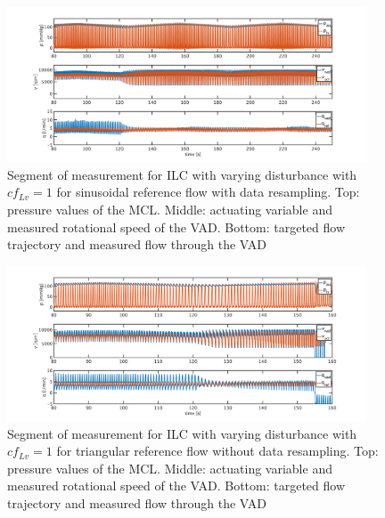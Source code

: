 \begin{figure}[ht!]
  \centering
  \includegraphics[width=0.95\textwidth]{images/chapt_5/ILC/ilc_var_dist_fix_sine.pdf}
  \caption[Segment of measurement for ILC with varying disturbance with $cf_{Lv}=1$ for sinusoidal reference flow with data resampling]{Segment of measurement for ILC with varying disturbance with $cf_{Lv}=1$ for sinusoidal reference flow with data resampling. Top:  pressure values of the MCL. Middle: actuating variable and measured rotational speed of the VAD. Bottom: targeted flow trajectory and measured flow through the VAD}
   \label{fig:anh_10}
\end{figure}

\begin{figure}[ht!]
  \centering
  \includegraphics[width=0.95\textwidth]{images/chapt_5/ILC/ilc_var_dist_unfix_triang.pdf}
  \caption[Segment of measurement for ILC with varying disturbance with $cf_{Lv}=1$ for triangular reference flow without data resampling]{Segment of measurement for ILC with varying disturbance with $cf_{Lv}=1$ for triangular reference flow without data resampling. Top:  pressure values of the MCL. Middle: actuating variable and measured rotational speed of the VAD. Bottom: targeted flow trajectory and measured flow through the VAD}
   \label{fig:anh_11}
\end{figure}

